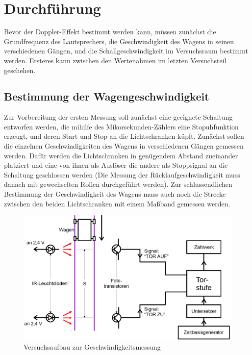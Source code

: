 \section{Durchführung}
\label{sec:Durchführung}

Bevor der Doppler-Effekt bestimmt werden kann, müssen zunächst die Grundfrequenz des Lautsprechers, die Geschwindigkeit des Wagens in seinen verschiedenen Gängen,
und die Schallgeschwindigkeit im Versuchsraum bestimmt werden. Ersteres kann zwischen den Wertenahmen im letzten Versuchsteil geschehen.


\subsection{Bestimmung der Wagengeschwindigkeit}
\label{sub:Bestimmung der Wagengeschwindigkeit}
Zur Vorbereitung der ersten Messung soll zunächst eine geeignete Schaltung entworfen werden, die mihilfe des Mikorsekunden-Zählers eine Stopuhfunktion erzeugt,
und deren Start und Stop an die Lichtschranken küpft. Zunächst sollen die einzelnen Geschwindigkeiten des Wagens in verschiedenen Gängen gemessen werden.
Dafür werden die Lichtschranken in genügendem Abstand zueinander platziert und eine von ihnen als Auslöser die andere als Stoppsignal an die Schaltung geschlossen werden
(Die Messung der Rücklaufgeschwindigkeit muss danach mit gewechselten Rollen durchgeführt werden).
Zur schlussendlichen Bestimmung der Geschwindigkeit des Wagens muss auch noch die Strecke zwischen den beiden Lichtschranken mit einem Maßband gemessen werden.
\begin{figure}
  \centering
  \includegraphics[width=\textwidth]{Geschwindigkeit.png}
  \caption{Versuchsaufbau zur Geschwindigkeitsmessung}
  \label{fig:Geschw}
\end{figure}
